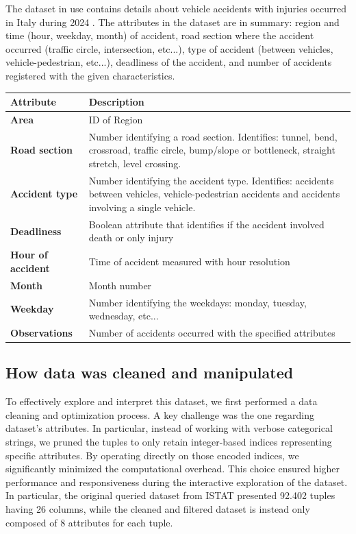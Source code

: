 \documentclass[12pt]{article}
\begin{document}
The dataset in use contains details about vehicle accidents with injuries occurred in Italy during 2024 \cite{dataset}. The attributes in the dataset are in summary: region and time (hour, weekday, month) of accident, road section where the accident occurred (traffic circle, intersection, etc...), type of accident (between vehicles, vehicle-pedestrian, etc...), deadliness of the accident, and number of accidents registered with the given characteristics.
\medbreak
\begin{small}
    \begin{center}
    \noindent\begin{tabularx}{0.9\textwidth} {| >{\bfseries}l | X |} 
        \hline
        Attribute & \textbf{Description} \\
        \hline\hline

        Area & ID of Region \\
        \hline
        Road section & Number identifying a road section. Identifies: tunnel, bend, crossroad, traffic circle, bump/slope or bottleneck, straight stretch, level crossing. \\
        \hline
        Accident type &  Number identifying the accident type. Identifies:
        accidents between vehicles, vehicle-pedestrian accidents and accidents involving
        a single vehicle. \\ 
        \hline
        Deadliness &  Boolean attribute that identifies if the accident involved death or only injury \\
        \hline
        Hour of accident &  Time of accident measured with hour resolution \\
        \hline
        Month &  Month number \\
        \hline
        Weekday & Number identifying the weekdays: monday, tuesday, wednesday, etc...\\
        \hline
        Observations &  Number of accidents occurred with the specified attributes \\
        \hline
    \end{tabularx}
\end{center}
\end{small}

\subsection{How data was cleaned and manipulated}

To effectively explore and interpret this dataset, we first performed a data cleaning and optimization process. A key challenge was the one regarding dataset's attributes. In particular, instead of working with verbose categorical strings, we pruned the tuples to only retain integer-based indices representing specific attributes.
By operating directly on those encoded indices, we significantly minimized the computational overhead. This choice ensured higher performance and responsiveness during the interactive exploration of the dataset.
In particular, the original queried dataset from ISTAT \cite{dataset} presented 92.402 tuples having 26 columns, while the cleaned and filtered dataset is instead only composed of 8 attributes for each tuple.
\end{document}
